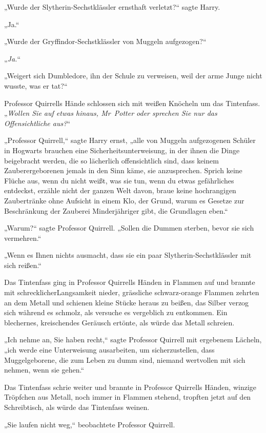 {„Wurde der Slytherin-Sechstklässler ernsthaft verletzt?“ sagte Harry.

„Ja.“

„Wurde der Gryffindor-Sechstklässler von Muggeln aufgezogen?“

„\emph{Ja.}“

„Weigert sich Dumbledore, ihn der Schule zu verweisen, weil der arme Junge nicht wusste, was er tat?“

Professor Quirrells Hände schlossen sich mit weißen Knöcheln um das Tintenfass. „\emph{Wollen Sie auf etwas hinaus, Mr~Potter oder sprechen Sie nur das} \emph{Offensichtliche aus?}“

„Professor Quirrell,“ sagte Harry ernst, „alle von Muggeln aufgezogenen Schüler in Hogwarts brauchen eine Sicherheitsunterweisung, in der ihnen die Dinge beigebracht werden, die so lächerlich offensichtlich sind, dass keinem Zauberergeborenen jemals in den Sinn käme, sie anzusprechen. Sprich keine Flüche aus, wenn du nicht weißt, was sie tun, wenn du etwas gefährliches entdeckst, erzähle nicht der ganzen Welt davon, braue keine hochrangigen Zaubertränke ohne Aufsicht in einem Klo, der Grund, warum es Gesetze zur Beschränkung der Zauberei Minderjähriger gibt, die Grundlagen eben.“

„Warum?“ sagte Professor Quirrell. „Sollen die Dummen sterben, bevor sie sich vermehren.“

„Wenn es Ihnen nichts ausmacht, dass sie ein paar Slytherin-Sechstklässler mit sich reißen.“

Das Tintenfass ging in Professor Quirrells Händen in Flammen auf und brannte mit schrecklicherLangsamkeit nieder, grässliche schwarz-orange Flammen zehrten an dem Metall und schienen kleine Stücke heraus zu beißen, das Silber verzog sich während es schmolz, als versuche es vergeblich zu entkommen. Ein blechernes, kreischendes Geräusch ertönte, als würde das Metall schreien.

„Ich nehme an, Sie haben recht,“ sagte Professor Quirrell mit ergebenem Lächeln, „ich werde eine Unterweisung ausarbeiten, um sicherzustellen, dass Muggelgeborene, die zum Leben zu dumm sind, niemand wertvollen mit sich nehmen, wenn sie gehen.“

Das Tintenfass schrie weiter und brannte in Professor Quirrells Händen, winzige Tröpfchen aus Metall, noch immer in Flammen stehend, tropften jetzt auf den Schreibtisch, als würde das Tintenfass weinen.

„Sie laufen nicht weg,“ beobachtete Professor Quirrell.

}
